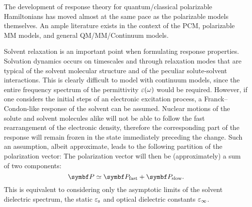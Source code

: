 The development of response theory for quantum/classical polarizable
Hamiltonians has moved almost at the same pace as the polarizable
models themselves.
An ample literature exists in the context of the
\acrshort{PCM},\autocite{Cammi1994-qj, Cammi1996-wf, Cammi1996-vx,
Cammi1999-rb, Cammi2003-qy, Frediani2005-nc, Ferrighi2010-pm}
polarizable \acrshort{MM} models,\autocite{Curutchet2009-bt, Olsen2010-wa,
Lipparini2012-hx, Lipparini2012-tl}
and general \acrshort*{QM}/\acrshort*{MM}/Continuum models.\autocite{Steindal2011-ki, Caprasecca2012-ir, Lipparini2013-ud}

Solvent relaxation is an important point when formulating response
properties. Solvation dynamics occurs on timescales and through
relaxation modes that are typical of the solvent molecular structure and of the
peculiar solute-solvent interactions.
This is clearly difficult to model with continuum models, since the
entire frequency spectrum of the permittivity $\varepsilon(\omega)$ would be
required.\autocite{Ingrosso2003-ev, Caricato2005-lo,
Mennucci2005-vi, Caricato2006-ba, Corni2015-pe}
However, if one considers the initial steps of an electronic excitation
process, a Franck--Condon-like response of the solvent can be assumed.
Nuclear motions of the solute and solvent molecules alike will not be able to
follow the fast rearrangement of the electronic density, therefore the
corresponding part of the response will remain frozen in the state
immediately preceding the change.
Such an assumption, albeit approximate, leads to the following partition
of the polarization vector:
The polarization vector will then be (approximately) a sum of two
components:
\begin{equation}
 \vect{P} \simeq \vect{P}_\mathrm{fast} + \vect{P}_\mathrm{slow}.
\end{equation}
This is equivalent to considering only the asymptotic limits of the solvent
dielectric spectrum, \ie the static $\varepsilon_\mathrm{s}$ and optical
dielectric constants $\varepsilon_\infty$.\autocite{Aguilar1993-pu, Cammi1995-ah,
Cammi2005-tb, Corni2005-nd}

